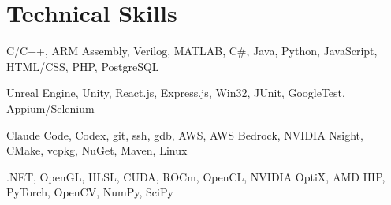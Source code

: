 \documentclass[letterpaper,11pt]{article}
\begin{document}
\section{Technical Skills}
    \small{\begin{description}[leftmargin=0.5in, itemindent=-0.25in, labelindent=0.5in, itemsep=-0.2em]
        \item[Languages] C/C++, ARM Assembly, Verilog, MATLAB, C\#, Java, Python, JavaScript, HTML/CSS, PHP, PostgreSQL
        \item[Frameworks] Unreal Engine, Unity, React.js, Express.js, Win32, JUnit, GoogleTest, Appium/Selenium
        \item[Developer tools] Claude Code, Codex, git, ssh, gdb, AWS, AWS Bedrock, NVIDIA Nsight, CMake, vcpkg, NuGet, Maven, Linux
        \item[Libraries/etc.] .NET, OpenGL, HLSL, CUDA, ROCm, OpenCL, NVIDIA OptiX, AMD HIP, PyTorch, OpenCV, NumPy, SciPy
    \end{description}}

\end{document}
